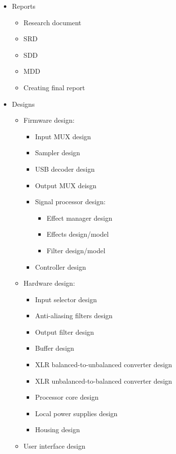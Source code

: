 \begin{itemize}
	\setlength\itemsep{-0.3em}
	\item Reports
	\begin{itemize}
		\setlength\itemsep{-0.3em}
		\item Research document
		\item SRD
		\item SDD
		\item MDD
		\item Creating final report
	\end{itemize}
	\item Designs
	\begin{itemize}
		\setlength\itemsep{-0.3em}
		\item Firmware design:
		\begin{itemize}
			\setlength\itemsep{-0.3em}
			\item Input MUX design
			\item Sampler design
			\item USB decoder design
			\item Output MUX deisgn
			\item Signal processor design:
			\begin{itemize}
				\setlength\itemsep{-0.3em}
				\item Effect manager design
				\item Effects design/model
				\item Filter design/model
			\end{itemize}
			\item Controller design
		\end{itemize}
		\item Hardware design:
		\begin{itemize}
			\setlength\itemsep{-0.3em}
			\item Input selector design
			\item Anti-aliasing filters design
			\item Output filter design
			\item Buffer design
			\item XLR balanced-to-unbalanced converter design
			\item XLR unbalanced-to-balanced converter design
			\item Processor core design
			\item Local power supplies design
			\item Housing design
		\end{itemize}
		\item User interface design

\end{itemize}
\end{itemize}
